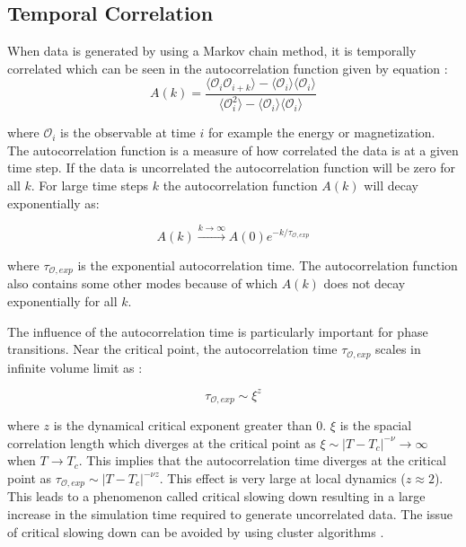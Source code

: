 \subsection{Temporal Correlation}
\label{sec:temporal_correlation}

When data is generated by using a Markov chain method, it is temporally
correlated which can be seen in the autocorrelation function given by equation
\cite{Janke2002}:
\begin{equation}
  \label{eq:autocorrelation}
  A(k) = \frac{\langle \mathcal{O}_i \mathcal{O}_{i+k}\rangle - \langle\mathcal{O}_i\rangle\langle\mathcal{O}_i\rangle}{\langle\mathcal{O}_i^2\rangle- \langle\mathcal{O}_i\rangle\langle\mathcal{O}_i\rangle}
\end{equation}

where $\mathcal{O}_i$ is the observable at time $i$ for example the energy or
magnetization. The autocorrelation function is a measure of how correlated the
data is at a given time step. If the data is uncorrelated the autocorrelation
function will be zero for all $k$. For large time steps $k$ the autocorrelation
function $A(k)$ will decay exponentially as:

\begin{equation}
  \label{eq:autocorrelation_decay}
  A(k) \xrightarrow{k\rightarrow\infty} A(0)e^{-k/\tau_{\mathcal{O}, exp}}
\end{equation}

where $\tau_{\mathcal{O}, exp}$ is the exponential autocorrelation time. The
autocorrelation function also contains some other modes because of which $A(k)$
does not decay exponentially for all $k$. 

The influence of the autocorrelation time is particularly important for phase
transitions. Near the critical point, the autocorrelation time
$\tau_{\mathcal{O},exp}$ scales in infinite volume limit as \cite{Janke2002}:

\begin{equation}
  \label{eq:autocorrelation_scaling}
  \tau_{\mathcal{O}, exp} \sim \xi^z
\end{equation}

where $z$ is the dynamical critical exponent greater than 0. $\xi$ is the
spacial correlation length which diverges at the critical point as $\xi \sim
|T-T_c|^{-\nu} \rightarrow \infty$ when $T\rightarrow T_c$. This implies that
the autocorrelation time diverges at the critical point as $\tau_{\mathcal{O},
exp} \sim |T-T_c|^{-\nu z}$. This effect is very large at local dynamics ($z
\approx 2$). This leads to a phenomenon called critical slowing down
\cite{Schneider1974,Heuer1992} resulting in a large increase in the simulation
time required to generate uncorrelated data. The issue of critical slowing down
can be avoided by using cluster algorithms \cite{Wolff1989}.


